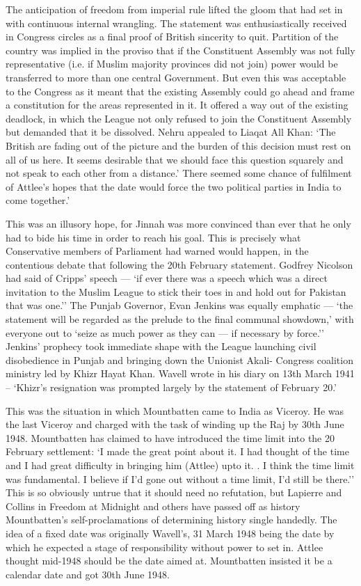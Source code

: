 The anticipation of freedom from imperial rule lifted the gloom that had set in with continuous internal wrangling. The statement was enthusiastically received in Congress circles as a final proof of British sincerity to quit. Partition of the country was implied in the proviso that if the Constituent Assembly was not fully representative (i.e. if Muslim majority provinces did not join) power would be transferred to more than one central Government. But even this was acceptable to the Congress as it meant that the existing Assembly could go ahead and frame a constitution for the areas represented in it. It offered a way out of the existing deadlock, in which the League not only refused to join the Constituent Assembly but demanded that it be dissolved. Nehru appealed to Liaqat All Khan: `The British are fading out of the picture and the burden of this decision must rest on all of us here. It seems desirable that we should face this question squarely and not speak to each other from a distance.' There seemed some chance of fulfilment of Attlee's hopes that the date would force the two political parties in India to come together.' 

This was an illusory hope, for Jinnah was more convinced than ever that he only had to bide his time in order to reach his goal. This is precisely what Conservative members of Parliament had warned would happen, in the contentious debate that following the 20th February statement. Godfrey Nicolson had said of Cripps' speech — `if ever there was a speech which was a direct invitation to the Muslim League to stick their toes in and hold out for Pakistan that was one.'' The Punjab Governor, Evan Jenkins was equally emphatic — `the statement will be regarded as the prelude to the final communal showdown,' with everyone out to `seize as much power as they can — if necessary by force.'' Jenkins' prophecy took immediate shape with the League launching civil disobedience in Punjab and bringing down the Unionist Akali- Congress coalition ministry led by Khizr Hayat Khan. Wavell wrote in his diary on 13th March 1941 -- `Khizr's resignation was prompted largely by the statement of February 20.' 

This was the situation in which Mountbatten came to India as Viceroy. He was the last Viceroy and charged with the task of winding up the Raj by 30th June 1948. Mountbatten has claimed to have introduced the time limit into the 20 February settlement: `I made the great point about it. I had thought of the time and I had great difficulty in bringing him (Attlee) upto it. . I think the time limit was fundamental. I believe if I'd gone out without a time limit, I'd still be there.'' This is so obviously untrue that it should need no refutation, but Lapierre and Collins in Freedom at Midnight and others have passed off as history Mountbatten's self-proclamations of determining history single­ handedly. The idea of a fixed date was originally Wavell's, 31 March 1948 being the date by which he expected a stage of responsibility without power to set in. Attlee thought mid-1948 should be the date aimed at. Mountbatten insisted it be a calendar date and got 30th June 1948. 

